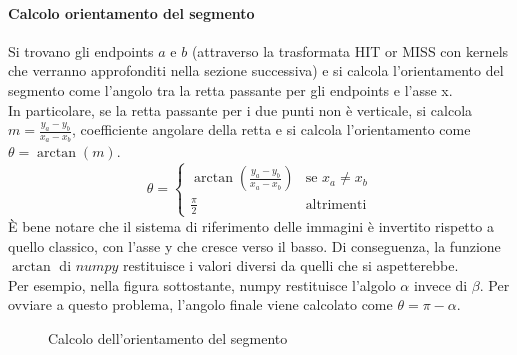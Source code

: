 \paragraph{Calcolo orientamento del segmento}
Si trovano gli endpoints $a$ e $b$ (attraverso la trasformata HIT or MISS con kernels che verranno approfonditi nella sezione successiva) e si calcola l'orientamento del segmento come l'angolo tra la retta passante per gli endpoints e l'asse x.\\
In particolare, se la retta passante per i due punti non è verticale, si calcola $m = \frac{y_a - y_b}{x_a-x_b}$, coefficiente angolare della retta e si calcola l'orientamento come $\theta = \arctan(m)$.
\begin{equation}
  \theta = \begin{cases}
    \arctan( \frac{y_a - y_b}{x_a-x_b}) & \text{se } x_a \neq x_b \\
    \frac{\pi}{2}                       & \text{altrimenti}
  \end{cases}
\end{equation}
È bene notare che il sistema di riferimento delle immagini è invertito rispetto a quello classico, con l'asse y che cresce verso il basso. Di conseguenza, la funzione $\arctan$ di $numpy$ restituisce i valori diversi da quelli che si aspetterebbe. \\
Per esempio, nella figura sottostante, numpy restituisce l'algolo $\alpha$ invece di $\beta$. Per ovviare a questo problema, l'angolo finale viene calcolato come $\theta = \pi - \alpha$.
\begin{figure}[H]
  \caption {Calcolo dell'orientamento del segmento}
\end{figure}
